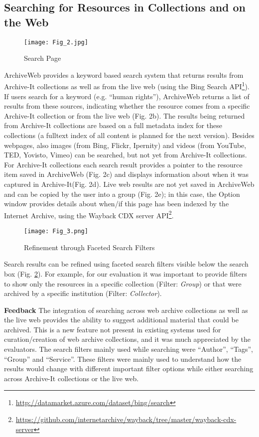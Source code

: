 \documentclass{llncs}
\begin{document}
\subsection{Searching for Resources in Collections and on the Web}\label{sec:search}
\begin{figure}[hbp]
\centering
\texttt{[image: Fig\_2.jpg]}
\caption{Search Page}
\label{search}
\end{figure}
ArchiveWeb provides a keyword based search system that
returns results from Archive-It collections as well as from the live
web (using the Bing Search
API\footnote{\url{http://datamarket.azure.com/dataset/bing/search}}). If
users search for a keyword (e.g. ``human rights''), ArchiveWeb returns
a list of results from these sources, indicating whether the resource
comes from a specific Archive-It collection or from the live web
(Fig. 2b). The results being returned from Archive-It collections are
based on a full metadata index for these collections (a fulltext index
of all content is planned for the next version). Besides webpages,
also images (from Bing, Flickr, Ipernity) and videos (from YouTube,
TED, Yovisto, Vimeo) can be searched, but not yet from Archive-It
collections.  For Archive-It collections each search result provides a
pointer to the resource item saved in ArchiveWeb (Fig. 2c) and
displays information about when it was captured in
Archive-It(Fig. 2d).  Live web results are not yet saved in ArchiveWeb
and can be copied by the user into a group (Fig. 2e); in this case,
the Option window provides details about when/if this page has been
indexed by the Internet Archive, using the Wayback CDX server
API\footnote{\url{https://github.com/internetarchive/wayback/tree/master/wayback-cdx-server}}.

\begin{figure}[!ht]
\texttt{[image: Fig\_3.png]}
\caption{Refinement through Faceted Search Filters}
\label{facet}
\end{figure}

Search results can be refined using faceted search
filters visible below the search box (Fig. \ref{facet}). For example,
for our evaluation it was important to provide filters to show only
the resources in a specific collection (Filter: \textit{Group}) or
that were archived by a specific institution (Filter:
\textit{Collector}).

\textbf{Feedback} The integration of searching across web archive
collections as well as the live web provides the ability to suggest additional
material that could be archived. This is a new feature not
present in existing systems used for curation/creation of web
archive collections, and it was much appreciated by the evaluators. 
The search filters
mainly used while searching were ``Author'', ``Tags'', ``Group'' and
``Service''. These filters were mainly used to understand how the
results would change with different important filter options while
either searching across Archive-It collections or the live web.
\end{document}

